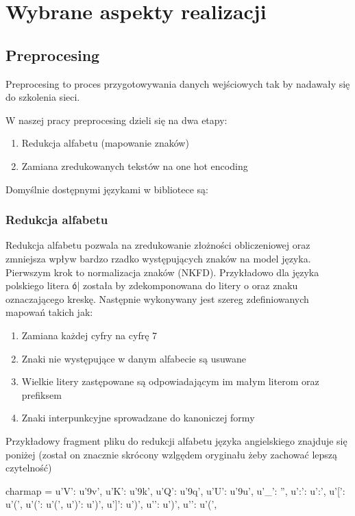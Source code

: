 \newpage
\section{Wybrane aspekty realizacji}

\subsection{Preprocesing}
Preprocesing to proces przygotowywania danych wejściowych tak by nadawały się do szkolenia sieci.

W naszej pracy preprocesing dzieli się na dwa etapy:
\begin{enumerate}
	\item Redukcja alfabetu (mapowanie znaków)
	\item Zamiana zredukowanych tekstów na one hot encoding
\end{enumerate}

Domyślnie dostępnymi językami w bibliotece są:
\languages 
 

\subsubsection{Redukcja alfabetu}
Redukcja alfabetu pozwala na zredukowanie złożności obliczeniowej oraz zmniejsza wpływ bardzo rzadko
występujących znaków na model języka. Pierwszym krok to normalizacja znaków (NKFD). 
Przykładowo dla języka polskiego litera \texttt{ó}| została by zdekomponowana do litery o oraz znaku oznaczającego kreskę.
Następnie wykonywany jest szereg zdefiniowanych mapowań takich jak:
\begin{enumerate}
  \item Zamiana każdej cyfry na cyfrę 7
  \item Znaki nie występujące w danym alfabecie są usuwane
  \item Wielkie litery zastępowane są odpowiadającym im małym literom oraz prefiksem
  \item Znaki interpunkcyjne sprowadzane do kanoniczej formy
\end{enumerate}
\newpage
{}
Przykładowy fragment pliku do redukcji alfabetu języka
angielskiego znajduje się poniżej (został on znacznie skrócony wzlgędem oryginału żeby zachować lepszą
czytelność)

\begin{python}
charmap = {
    u'V': u'\xb9v',     
    u'K': u'\xb9k',         
    u'Q': u'\xb9q',        
    u'U': u'\xb9u',   
    u'_': '',             
    u':': u':',             
    u'[': u'(',           
    u'(': u'(',               
    u')': u')',              
    u']': u')',              
    u'}': u')',              
    u'{': u'(',                 
}
\end{python}

